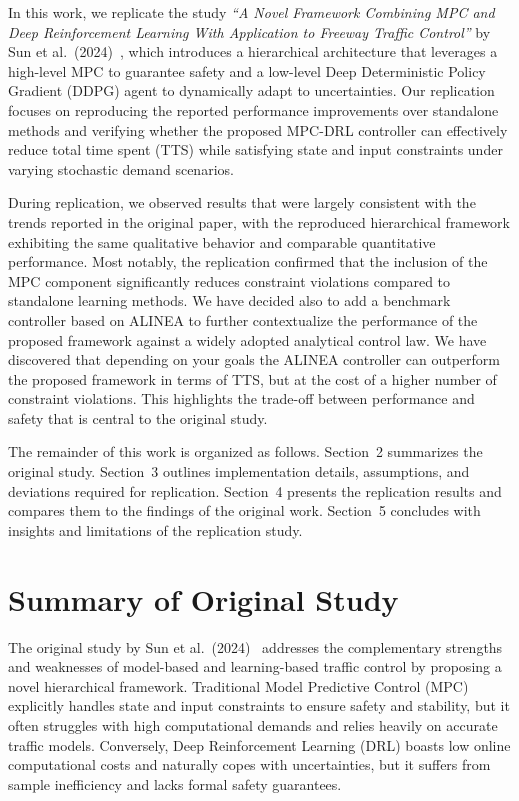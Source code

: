 In this work, we replicate the study \textit{``A Novel Framework Combining MPC and Deep Reinforcement Learning With Application to Freeway Traffic Control''} by Sun et al.~(2024)~\cite{sun2024novel}, which introduces a hierarchical architecture that leverages a high-level MPC to guarantee safety and a low-level Deep Deterministic Policy Gradient (DDPG) agent to dynamically adapt to uncertainties. Our replication focuses on reproducing the reported performance improvements over standalone methods and verifying whether the proposed MPC-DRL controller can effectively reduce total time spent (TTS) while satisfying state and input constraints under varying stochastic demand scenarios.

During replication, we observed results that were largely consistent with the trends reported in the original paper, with the reproduced hierarchical framework exhibiting the same qualitative behavior and comparable quantitative performance. Most notably, the replication confirmed that the inclusion of the MPC component significantly reduces constraint violations compared to standalone learning methods. We have decided also to add a benchmark controller based on ALINEA to further contextualize the performance of the proposed framework against a widely adopted analytical control law. We have discovered that depending on your goals the ALINEA controller can outperform the proposed framework in terms of TTS, but at the cost of a higher number of constraint violations. This highlights the trade-off between performance and safety that is central to the original study. 

The remainder of this work is organized as follows. Section~2 summarizes the original study. Section~3 outlines implementation details, assumptions, and deviations required for replication. Section~4 presents the replication results and compares them to the findings of the original work. Section~5 concludes with insights and limitations of the replication study.

\newpage
\section{Summary of Original Study}

The original study by Sun et al.~(2024)~\cite{sun2024novel} addresses the complementary strengths and weaknesses of model-based and learning-based traffic control by proposing a novel hierarchical framework. Traditional Model Predictive Control (MPC) explicitly handles state and input constraints to ensure safety and stability, but it often struggles with high computational demands and relies heavily on accurate traffic models. Conversely, Deep Reinforcement Learning (DRL) boasts low online computational costs and naturally copes with uncertainties, but it suffers from sample inefficiency and lacks formal safety guarantees. 

